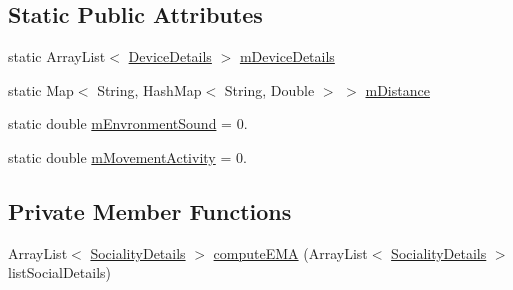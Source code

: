 \subsection*{Static Public Attributes}
\begin{DoxyCompactItemize}
\item 
static Array\+List$<$ \hyperlink{classcs_1_1usense_1_1inference_module_1_1_social_interaction_1_1_device_details}{Device\+Details} $>$ \hyperlink{classcs_1_1usense_1_1inference_module_1_1_social_interaction_a3477d470779b29ee7f22f19df6e3765f}{m\+Device\+Details}
\item 
static Map$<$ String, Hash\+Map$<$ String, Double $>$ $>$ \hyperlink{classcs_1_1usense_1_1inference_module_1_1_social_interaction_a76f091e27cb40a22693e8c5bc7c53e45}{m\+Distance}
\item 
static double \hyperlink{classcs_1_1usense_1_1inference_module_1_1_social_interaction_a71175553a50cb899d8ef2f19c7b70852}{m\+Envronment\+Sound} = 0.
\item 
static double \hyperlink{classcs_1_1usense_1_1inference_module_1_1_social_interaction_ab00945e5a52810f2d7e051f2e4878d4c}{m\+Movement\+Activity} = 0.
\end{DoxyCompactItemize}
\subsection*{Private Member Functions}
\begin{DoxyCompactItemize}
\item 
Array\+List$<$ \hyperlink{classcs_1_1usense_1_1inference_module_1_1_sociality_details}{Sociality\+Details} $>$ \hyperlink{classcs_1_1usense_1_1inference_module_1_1_social_interaction_a5e7790d7bbe3f2f4eb55a9f42c74ce98}{compute\+E\+M\+A} (Array\+List$<$ \hyperlink{classcs_1_1usense_1_1inference_module_1_1_sociality_details}{Sociality\+Details} $>$ list\+Social\+Details)
\end{DoxyCompactItemize}
